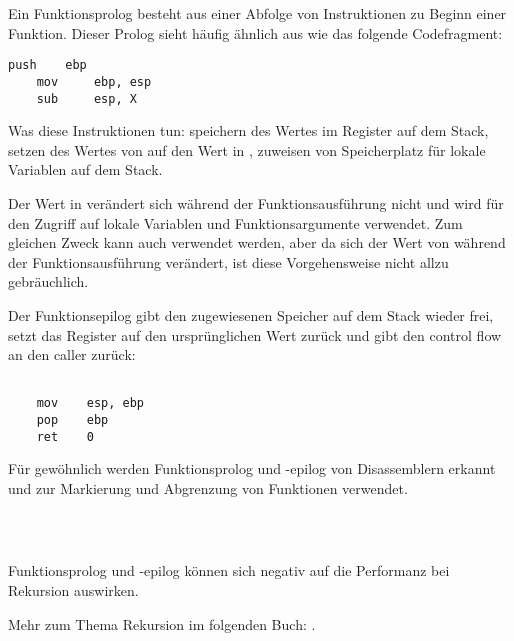 \label{sec:prologepilog}

Ein Funktionsprolog besteht aus einer Abfolge von Instruktionen zu Beginn einer
Funktion. Dieser Prolog sieht häufig ähnlich aus wie das folgende Codefragment:

\begin{lstlisting}[style=customasmx86]
    push    ebp
    mov     ebp, esp
    sub     esp, X
\end{lstlisting}

Was diese Instruktionen tun: speichern des Wertes im \EBP Register auf dem
Stack, setzen des Wertes von \EBP auf den Wert in \ESP, zuweisen von Speicherplatz für lokale
Variablen auf dem Stack.

Der Wert in \EBP verändert sich während der Funktionsausführung nicht und wird
für den Zugriff auf lokale Variablen und Funktionsargumente verwendet. Zum
gleichen Zweck kann auch \ESP verwendet werden, aber da sich der Wert von \ESP
während der Funktionsausführung verändert, ist diese Vorgehensweise nicht allzu
gebräuchlich.

Der Funktionsepilog gibt den zugewiesenen Speicher auf dem Stack wieder frei,
setzt das \EBP Register auf den ursprünglichen Wert zurück und gibt den control
flow an den \gls{caller} zurück:

\begin{lstlisting}[style=customasmx86]

    mov    esp, ebp
    pop    ebp
    ret    0
\end{lstlisting}

Für gewöhnlich werden Funktionsprolog und -epilog von Disassemblern erkannt und
zur Markierung und Abgrenzung von Funktionen verwendet.

　
\subsection{\Rekursion}

\myindex{\Recursion}
Funktionsprolog und -epilog können sich negativ auf die Performanz bei Rekursion
auswirken. 

Mehr zum Thema Rekursion im folgenden Buch: .
